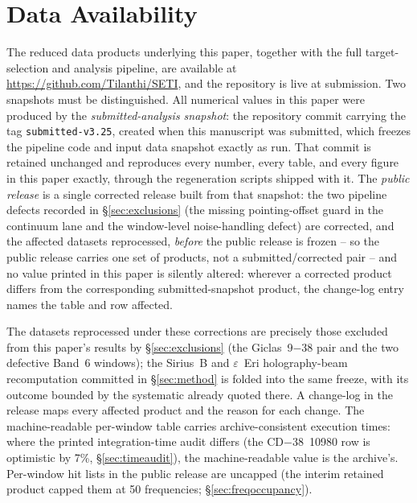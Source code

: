 \documentclass{openjournal}
\begin{document}
\section*{Data Availability}
The reduced data products underlying this paper, together with the full
target-selection and analysis pipeline, are available at
\url{https://github.com/Tilanthi/SETI}, and the repository is live at
submission. Two snapshots must be distinguished. All numerical values
in this paper were produced by the \emph{submitted-analysis snapshot}:
the repository commit carrying the tag \texttt{submitted-v3.25},
created when this manuscript was submitted, which freezes the pipeline
code and input data snapshot exactly as run. That commit is retained
unchanged and reproduces every number, every table, and every figure in
this paper exactly, through the regeneration scripts shipped with it.
The \emph{public release} is a single corrected release built from that
snapshot: the two pipeline defects recorded in \S\ref{sec:exclusions}
(the missing pointing-offset guard in the continuum lane and the
window-level noise-handling defect) are corrected, and the affected
datasets reprocessed, \emph{before} the public release is frozen -- so the
public release carries one set of products, not a
submitted/corrected pair -- and no value printed in this paper
is silently altered: wherever a corrected product differs from the
corresponding submitted-snapshot product, the change-log entry names
the table and row affected.

The datasets reprocessed under these
corrections are precisely those excluded from this paper's results by
\S\ref{sec:exclusions} (the Giclas~9$-$38 pair and the two defective
Band~6 windows); the Sirius~B and $\varepsilon$~Eri
holography-beam recomputation committed in \S\ref{sec:method} is folded
into the same freeze, with its outcome bounded by the systematic
already quoted there. A change-log in the release maps every affected
product and the reason for each change. The machine-readable per-window
table carries archive-consistent execution times: where the printed
integration-time audit differs (the CD$-$38~10980 row is optimistic by
7\%, \S\ref{sec:timeaudit}), the machine-readable value is the
archive's. Per-window hit lists in the public release are uncapped
(the interim retained product capped them at 50 frequencies;
\S\ref{sec:freqoccupancy}).
\end{document}
